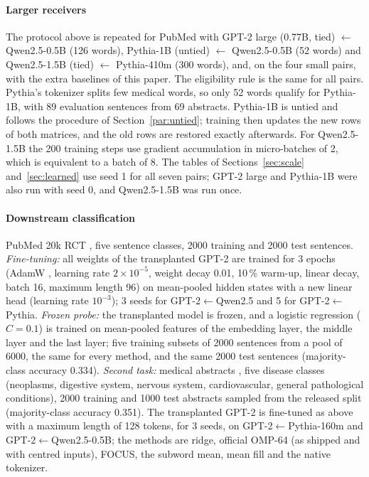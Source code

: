 \documentclass[preprint,12pt]{elsarticle}
\begin{document}
\paragraph{Larger receivers}\label{par:large} The protocol above is repeated for PubMed with GPT-2 large (0.77B, tied) $\leftarrow$ Qwen2.5-0.5B (126 words), Pythia-1B (untied) $\leftarrow$ Qwen2.5-0.5B (52 words) and Qwen2.5-1.5B (tied) $\leftarrow$ Pythia-410m (300 words), and, on the four small pairs, with the extra baselines of this paper. The eligibility rule is the same for all pairs. Pythia's tokenizer splits few medical words, so only 52 words qualify for Pythia-1B, with 89 evaluation sentences from 69 abstracts. Pythia-1B is untied and follows the procedure of Section~\ref{par:untied}; training then updates the new rows of both matrices, and the old rows are restored exactly afterwards. For Qwen2.5-1.5B the 200 training steps use gradient accumulation in micro-batches of 2, which is equivalent to a batch of 8. The tables of Sections~\ref{sec:scale} and~\ref{sec:learned} use seed 1 for all seven pairs; GPT-2 large and Pythia-1B were also run with seed 0, and Qwen2.5-1.5B was run once.

\paragraph{Downstream classification} PubMed 20k RCT \cite{dernoncourt2017pubmedrct}, five sentence classes, 2000 training and 2000 test sentences. \emph{Fine-tuning:} all weights of the transplanted GPT-2 are trained for 3 epochs (AdamW \cite{loshchilov2019adamw}, learning rate $2\times10^{-5}$, weight decay 0.01, 10\,\% warm-up, linear decay, batch 16, maximum length 96) on mean-pooled hidden states with a new linear head (learning rate $10^{-3}$); 3 seeds for GPT-2$\leftarrow$Qwen2.5 and 5 for GPT-2$\leftarrow$Pythia. \emph{Frozen probe:} the transplanted model is frozen, and a logistic regression ($C=0.1$) is trained on mean-pooled features of the embedding layer, the middle layer and the last layer; five training subsets of 2000 sentences from a pool of 6000, the same for every method, and the same 2000 test sentences (majority-class accuracy 0.334). \emph{Second task:} medical abstracts \cite{schopf2022evaluating}, five disease classes (neoplasms, digestive system, nervous system, cardiovascular, general pathological conditions), 2000 training and 1000 test abstracts sampled from the released split (majority-class accuracy 0.351). The transplanted GPT-2 is fine-tuned as above with a maximum length of 128 tokens, for 3 seeds, on GPT-2$\leftarrow$Pythia-160m and GPT-2$\leftarrow$Qwen2.5-0.5B; the methods are ridge, official OMP-64 (as shipped and with centred inputs), FOCUS, the subword mean, mean fill and the native tokenizer.
\end{document}
